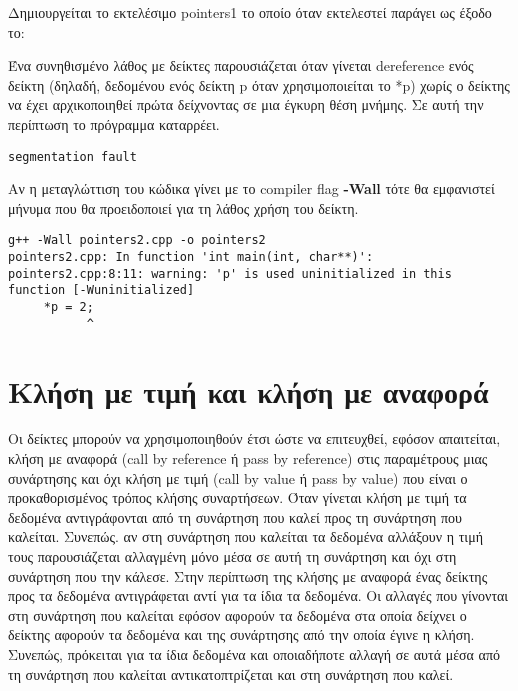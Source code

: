 Δημιουργείται το εκτελέσιμο pointers1 το οποίο όταν εκτελεστεί παράγει ως έξοδο το: 


Ένα συνηθισμένο λάθος με δείκτες παρουσιάζεται όταν γίνεται dereference ενός δείκτη (δηλαδή, δεδομένου ενός δείκτη p όταν χρησιμοποιείται το *p) χωρίς ο δείκτης να έχει αρχικοποιηθεί πρώτα δείχνοντας σε μια έγκυρη θέση μνήμης. Σε αυτή την περίπτωση το πρόγραμμα καταρρέει. 



\begin{lstlisting}[style=DOS]
segmentation fault
\end{lstlisting}

Αν η μεταγλώττιση του κώδικα γίνει με το compiler flag \textbf{-Wall} τότε θα εμφανιστεί μήνυμα που θα προειδοποιεί για τη λάθος χρήση του δείκτη.

\begin{lstlisting}[style=DOS]
g++ -Wall pointers2.cpp -o pointers2
pointers2.cpp: In function 'int main(int, char**)':
pointers2.cpp:8:11: warning: 'p' is used uninitialized in this function [-Wuninitialized]
     *p = 2;
           ^
\end{lstlisting}

\section{Κλήση με τιμή και κλήση με αναφορά}
Οι δείκτες μπορούν να χρησιμοποιηθούν έτσι ώστε να επιτευχθεί, εφόσον απαιτείται, κλήση με αναφορά (call by reference ή pass by reference) στις παραμέτρους μιας συνάρτησης και όχι κλήση με τιμή (call by value ή pass by value) που είναι ο προκαθορισμένος τρόπος κλήσης συναρτήσεων. Όταν γίνεται κλήση με τιμή τα δεδομένα αντιγράφονται από τη συνάρτηση που καλεί προς τη συνάρτηση που καλείται. Συνεπώς. αν στη συνάρτηση που καλείται τα δεδομένα αλλάξουν η τιμή τους παρουσιάζεται αλλαγμένη μόνο μέσα σε αυτή τη συνάρτηση και όχι στη συνάρτηση που την κάλεσε. Στην περίπτωση της κλήσης με αναφορά ένας δείκτης προς τα δεδομένα αντιγράφεται αντί για τα ίδια τα δεδομένα. Οι αλλαγές που γίνονται στη συνάρτηση που καλείται εφόσον αφορούν τα δεδομένα στα οποία δείχνει ο δείκτης αφορούν τα δεδομένα και της συνάρτησης από την οποία έγινε η κλήση. Συνεπώς, πρόκειται για τα ίδια δεδομένα και οποιαδήποτε αλλαγή σε αυτά μέσα από τη συνάρτηση που καλείται αντικατοπτρίζεται και στη συνάρτηση που καλεί.

